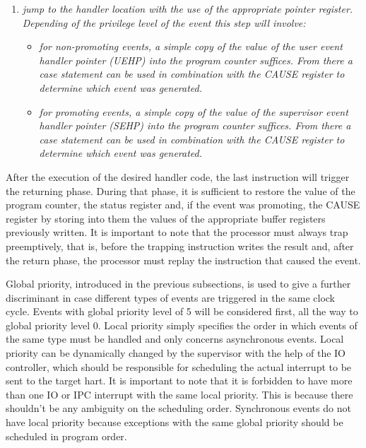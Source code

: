\begin{enumerate}
            \item \textit{jump to the handler location with the use of the appropriate pointer register. Depending of the privilege level of the event this step will involve:}

                \begin{itemize}

                    \item \textit{for non-promoting events, a simple copy of the value of the user event handler pointer (UEHP) into the program counter suffices. From there a case statement can be used in combination with the CAUSE register to determine which event was generated.}

                    \item \textit{for promoting events, a simple copy of the value of the supervisor event handler pointer (SEHP) into the program counter suffices. From there a case statement can be used in combination with the CAUSE register to determine which event was generated.}

                \end{itemize}

        \end{enumerate}

        After the execution of the desired handler code, the last instruction will trigger the returning phase. During that phase, it is sufficient to restore the value of the program counter, the status register and, if the event was promoting, the CAUSE register by storing into them the values of the appropriate buffer registers previously written. It is important to note that the processor must always trap preemptively, that is, before the trapping instruction writes the result and, after the return phase, the processor must replay the instruction that caused the event.

        \vspace{10pt}

        Global priority, introduced in the previous subsections, is used to give a further discriminant in case different types of events are triggered in the same clock cycle. Events with global priority level of 5 will be considered first, all the way to global priority level 0. Local priority simply specifies the order in which events of the same type must be handled and only concerns asynchronous events. Local priority can be dynamically changed by the supervisor with the help of the IO controller, which should be responsible for scheduling the actual interrupt to be sent to the target hart. It is important to note that it is forbidden to have more than one IO or IPC interrupt with the same local priority. This is because there shouldn't be any ambiguity on the scheduling order. Synchronous events do not have local priority because exceptions with the same global priority should be scheduled in program order.

